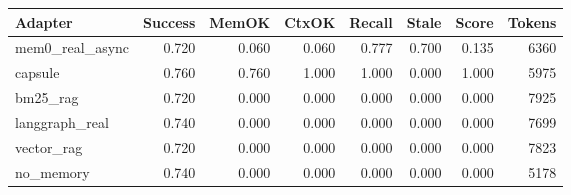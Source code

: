\begin{tabular}{lrrrrrrr}
\hline
Adapter & Success & MemOK & CtxOK & Recall & Stale & Score & Tokens \\
\hline
mem0\_real\_async & 0.720 & 0.060 & 0.060 & 0.777 & 0.700 & 0.135 & 6360 \\
capsule & 0.760 & 0.760 & 1.000 & 1.000 & 0.000 & 1.000 & 5975 \\
bm25\_rag & 0.720 & 0.000 & 0.000 & 0.000 & 0.000 & 0.000 & 7925 \\
langgraph\_real & 0.740 & 0.000 & 0.000 & 0.000 & 0.000 & 0.000 & 7699 \\
vector\_rag & 0.720 & 0.000 & 0.000 & 0.000 & 0.000 & 0.000 & 7823 \\
no\_memory & 0.740 & 0.000 & 0.000 & 0.000 & 0.000 & 0.000 & 5178 \\
\hline
\end{tabular}
